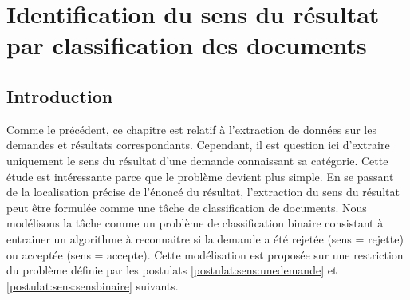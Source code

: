 \chapter{Identification du sens du résultat par classification des documents}
\label{chap:sensresultat}


%
%
%
%
%
%
%

\section{Introduction}
\label{sec:sensresultat:motivation}
Comme le précédent, ce chapitre est relatif à l'extraction de données sur les demandes et résultats correspondants. Cependant, il est question ici d'extraire uniquement le sens du résultat d'une demande connaissant sa catégorie. Cette étude est intéressante parce que le problème devient plus simple. En se passant de la localisation précise de l'énoncé du résultat, l'extraction du sens du résultat peut être formulée comme une tâche de classification de documents. Nous modélisons la tâche comme un problème de classification binaire consistant à entrainer un algorithme à reconnaitre si la demande a été rejetée (sens = rejette) ou acceptée (sens = accepte). Cette modélisation est proposée sur une restriction du problème définie par les postulats \ref{postulat:sens:unedemande} et \ref{postulat:sens:sensbinaire} suivants.

